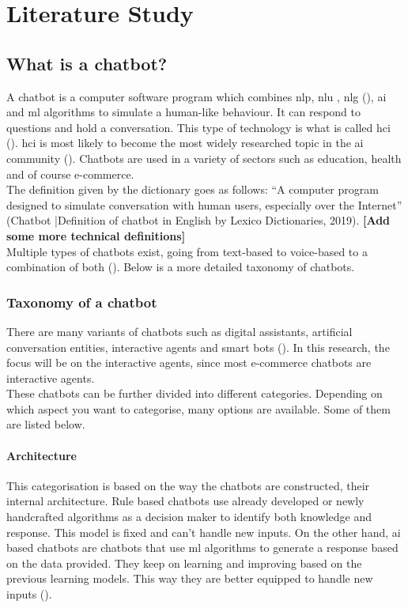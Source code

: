 \mainmatter
\pagestyle{headings}

\chapter{Literature Study}
\label{ch:literature-study}

\section{What is a chatbot?}
A chatbot is a computer software program which combines \acrfull{nlp}, \acrfull{nlu} , \acrfull{nlg} (\cite{Adamopoulou2020}), \acrfull{ai} and \acrfull{ml} algorithms to simulate a human-like behaviour. It can respond to questions and hold a conversation. This type of technology is what is called \acrfull{hci} (\cite{Adamopoulou2020}).  \acrshort{hci} is most likely to become the most widely researched topic in the \acrshort{ai} community (\cite{Bansal2018}). Chatbots are used in a variety of sectors such as education, health and of course e-commerce.\cite{Goot2020CustomerSC}\\
\break
The definition given by the dictionary goes as follows: “A computer program designed to simulate conversation with human users, especially over the Internet” (Chatbot |Definition of chatbot in English by Lexico Dictionaries, 2019). \textbf{[Add some more technical definitions]}\\
\break
Multiple types of chatbots exist, going from text-based to voice-based to a combination of both (\cite{Radziwil2021}). Below is a more detailed taxonomy of chatbots.\\

\subsection{Taxonomy of a chatbot}
There are many variants of chatbots such as digital assistants, artificial conversation entities, interactive agents and smart bots (\cite{Adamopoulou2020}). In this research, the focus will be on the interactive agents, since most e-commerce chatbots are interactive agents.\\
\break
These chatbots can be further divided into different categories. Depending on which aspect you want to categorise, many options are available. Some of them are listed below.\\

\subsubsection{Architecture}
This categorisation is based on the way the chatbots are constructed, their internal architecture. Rule based chatbots use already developed or newly handcrafted algorithms as a decision maker to identify both knowledge and response. This model is fixed and can’t handle new inputs. On the other hand, \acrshort{ai} based chatbots are chatbots that use \acrlong{ml} algorithms to generate a response based on the data provided. They keep on learning and improving based on the previous learning models. This way they are better equipped to handle new inputs (\cite{Maroengsit2019}).\\

